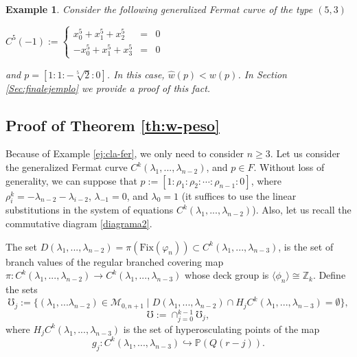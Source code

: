 \documentclass{amsart}
\newcommand{\HC}[4]{\ensuremath{H_{#1}C^{#2}(#4_1,...,#4_{#3})}}
\newcommand{\C}[3]{\ensuremath{C^{#1}(#3_1,...,#3_{#2})}}
\newtheorem{example}[theorem]{Example}
\begin{document}
\begin{example}\label{ej:bound}
Consider the following generalized Fermat curve of the type $(5,3)$  
\begin{center}
$C^5(-1):=\left \{ \begin{array}{rcc}
x_0^5+x_1^5+x_2^5&=&0\\
-x_0^5+x_1^5+x_3^5&=&0
\end{array}\right .$
\end{center}
and $p=[1:1:-\sqrt[5]{2}:0]$. 
In this case, $\hat{w}(p)<w(p)$.  In Section \ref{Sec:finalejemplo} we provide a proof of this fact.  
\end{example}
 
 
\subsection{Proof of Theorem  \ref{th:w-peso}}
Because of Example \ref{ej:cla-fer}, we only need to consider $n\geq 3$.  
 Let us consider the generalized Fermat curve $\C{k}{n-2}{\lambda}$, and $p\in F$.  Without loss of generality, 
 we can suppose that 
$p:=[1:\rho_1:\rho_2:\cdots :\rho_{n-1}:0]$, where $\rho_i^k=-\lambda_{n-2}-\lambda_{i-2}$,  $\lambda_{-1}=0$, and  $\lambda_{0}=1$
(it suffices to use the linear substitutions in the system of equations $\C{k}{n-2}{\lambda}$).
Also, let us recall the commutative diagram \eqref{diagrama2}.

The set $D(\lambda_1,...,\lambda_{n-2})=\pi({\mathrm{Fix}}(\varphi_n))\subset \C{k}{n-3}{\lambda}$, is the set of branch values of the regular branched covering map $\pi:\C{k}{n-2}{\lambda} \to \C{k}{n-3}{\lambda}$ whose deck group is $\langle \phi_{n} \rangle \cong {\mathbb Z}_{k}$. Define the sets
$$\mho_j:=\{(\lambda_1,...\lambda_{n-2})\in\mathcal{M}_{0, n+1} \mid D(\lambda_1,...,\lambda_{n-2})
 \cap \HC{j}{k}{n-3}{\lambda}=\emptyset \},$$
$$\mho:=\cap_{j=0}^{k-1}\mho_{j},$$
where $\HC{j}{k}{n-3}{\lambda}$ is the set of hyperosculating points of the map 
$$g_j:\C{k}{n-3}{\lambda}\hookrightarrow {\mathbb{P}}(Q(r-j)).$$  
\end{document}
